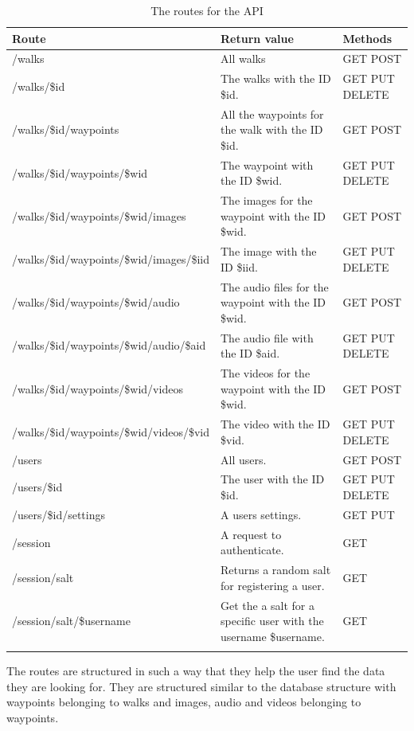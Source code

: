 \documentclass[11pt,a4paper]{article}
\begin{document}
\begin{longtable}{m{}|m{}|C{0.11\textwidth}}
    \textbf{Route} & \textbf{Return value} & \textbf{Methods} \\\hline
    /walks & All walks & GET POST\\ \hline
    /walks/\$id & The walks with the ID \$id. & GET PUT DELETE\\ \hline
    /walks/\$id/waypoints & All the waypoints for the walk with the ID \$id. & GET POST\\ \hline
    /walks/\$id/waypoints/\$wid & The waypoint with the ID \$wid. & GET PUT DELETE \\ \hline
    /walks/\$id/waypoints/\$wid/images & The images for the waypoint with the ID \$wid. & GET POST \\ \hline
    /walks/\$id/waypoints/\$wid/images/\$iid & The image with the ID \$iid. & GET PUT DELETE \\ \hline
    /walks/\$id/waypoints/\$wid/audio & The audio files for the waypoint with the ID \$wid. & GET POST \\ \hline
    /walks/\$id/waypoints/\$wid/audio/\$aid & The audio file with the ID \$aid. & GET PUT DELETE \\ \hline
    /walks/\$id/waypoints/\$wid/videos & The videos for the waypoint with the ID \$wid. & GET POST \\ \hline
    /walks/\$id/waypoints/\$wid/videos/\$vid & The video with the ID \$vid. & GET PUT DELETE \\ \hline
    /users & All users. & GET POST \\\hline
    /users/\$id & The user with the ID \$id. & GET PUT DELETE \\\hline
    /users/\$id/settings & A users settings. & GET PUT \\\hline
    /session & A request to authenticate. & GET\\\hline
    /session/salt & Returns a random salt for registering a user. & GET\\\hline
    /session/salt/\$username & Get the a salt for a specific user with the username \$username. & GET\\
    \caption {The routes for the API}
    \label{routes}
\end{longtable}

The routes are structured in such a way that they help the user find the data they are looking for. They are structured similar to the database structure with waypoints belonging to walks and images, audio and videos belonging to waypoints. 
\end{document}
